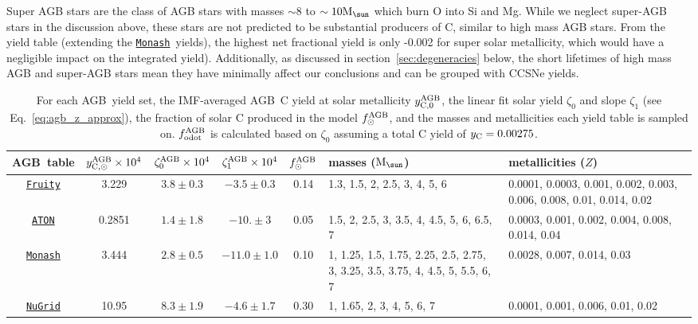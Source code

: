 \documentclass[fleqn,
usenatbib]{mnras}
\newcommand{\fruity}{\texttt{\hyperlink{fruity}{Fruity}}}
\newcommand{\nugrid}{\texttt{\hyperlink{nugrid}{NuGrid}}}
\newcommand{\monash}{\texttt{\hyperlink{monash}{Monash}}}
\newcommand{\aton}{\texttt{\hyperlink{aton}{ATON}}}
\newcommand{\agb}{AGB}
\newcommand{\Yct}{{y_{\rm C}}}
\newcommand{\zetao}{\zeta_0}
\newcommand{\zetai}{\zeta_{1}}
\newcommand{\Mo}{ {\rm M}_{\sun}}
\begin{document}
Super AGB stars are the class of AGB stars with masses $\sim8$ to $\sim10\Mo$ which burn O into Si and Mg. While we neglect super-AGB stars in the discussion above, these stars are not predicted to be substantial producers of C, similar to high mass AGB stars. From the \citet{doherty+14, doherty+14b} yield table (extending the \monash\ yields), the highest net fractional yield is only -0.002 for super solar metallicity, which would have a negligible impact on the integrated yield). Additionally, as discussed in section~\ref{sec:degeneracies} below, the short lifetimes of high mass AGB and super-AGB stars mean they have minimally affect our conclusions and can be grouped with CCSNe yields.


\begin{table}
	\centering
    \caption[]{For each \agb\ yield set, the IMF-averaged \agb\ C yield at solar metallicity $y_{\rm C, 0}^{\rm AGB}$, the linear fit solar yield $\zetao$ and slope $\zetai$ (see Eq.~\ref{eq:agb_z_approx}), the fraction of solar C produced in the model $f_\odot^{\rm AGB}$, and the masses and metallicities each yield table is sampled on.
    $f_{\rm odot}^{\rm AGB}$ is calculated based on $\zetao$ assuming a total C yield of $\Yct = 0.00275$.
    }

	\label{tab:agb}
    \begin{tabular}{c  ccc  c p{4cm} p{4cm}} %
		\hline 
        \agb\ table 
                & $y_{\rm C, \odot}^{\rm AGB}\times10^4$ %
                & $\zetao^{\rm AGB}\times 10^4$ %
                & $\zetai^{\rm AGB}\times 10^4$
                &  $f_\odot^{\rm AGB}$
                & masses ($\Mo$) & metallicities ($Z$)\\
        \hline
        \fruity 
                & 3.229
                &  $3.8\pm0.3$
                & $-3.5\pm0.3$
                & 0.14
                & 1.3, 1.5, 2, 2.5, 3, 4, 5, 6
                & 0.0001, 0.0003, 0.001, 0.002, 0.003, 0.006, 0.008, 0.01, 0.014, 0.02
                \\
        \aton 
                & 0.2851
                & $1.4\pm1.8$
                & $-10. \pm 3$
                & 0.05
                & 1.5, 2, 2.5, 3, 3.5, 4, 4.5, 5, 6, 6.5, 7
                & 0.0003, 0.001, 0.002, 0.004, 0.008, 0.014, 0.04
                \\
        \monash 
                &  3.444
                & $2.8 \pm 0.5$
                & $-11.0\pm 1.0$
                & 0.10
                & 1, 1.25, 1.5, 1.75, 2.25, 2.5, 2.75, 3, 3.25, 3.5, 3.75, 4, 4.5, 5, 5.5, 6, 7 
                & 0.0028, 0.007, 0.014, 0.03
                \\
        \nugrid 
                & 10.95
                & $8.3\pm 1.9$
                & $-4.6\pm1.7$
                & 0.30
                & 1, 1.65, 2, 3, 4, 5, 6, 7
                &  0.0001, 0.001, 0.006, 0.01, 0.02
                \\
		\hline
	\end{tabular}
\end{table}
\end{document}
